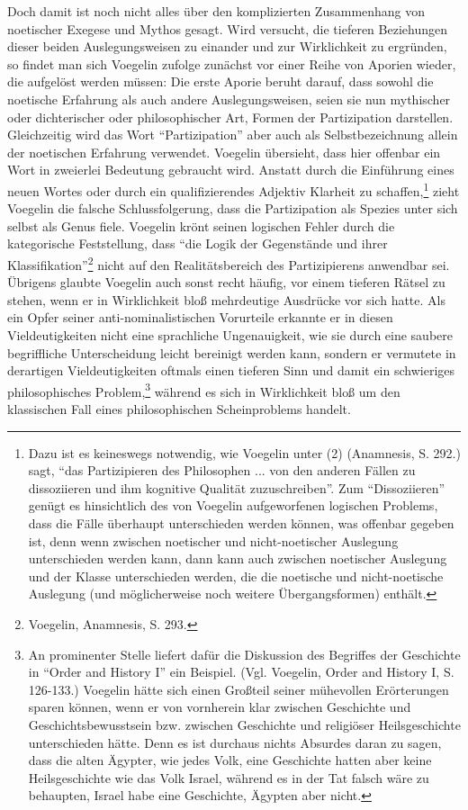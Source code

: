 Doch damit ist noch nicht alles über den komplizierten Zusammenhang von
noetischer Exegese und Mythos gesagt. Wird versucht, die tieferen Beziehungen
dieser beiden Auslegungsweisen zu einander und zur Wirklichkeit zu ergründen,
so findet man sich Voegelin zufolge zunächst vor einer Reihe von Aporien
wieder, die aufgelöst werden müssen: Die erste Aporie beruht darauf, dass
sowohl die noetische Erfahrung als auch andere Auslegungsweisen, seien sie nun
mythischer oder dichterischer oder philosophischer Art, Formen der
Partizipation darstellen.  Gleichzeitig wird das Wort "`Partizipation"' aber
auch als Selbstbezeichnung allein der noetischen Erfahrung verwendet.
Voegelin übersieht, dass hier offenbar ein Wort in zweierlei Bedeutung
gebraucht wird. Anstatt durch die Einführung eines neuen Wortes oder durch ein
qualifizierendes Adjektiv Klarheit zu schaffen,\footnote{Dazu ist es
  keineswegs notwendig, wie Voegelin unter (2) (Anamnesis, S. 292.) sagt,
  "`das Partizipieren des Philosophen ... von den anderen Fällen zu
  dissoziieren und ihm kognitive Qualität zuzuschreiben"'.  Zum
  "`Dissoziieren"' genügt es hinsichtlich des von Voegelin aufgeworfenen
  logischen Problems, dass die Fälle überhaupt unterschieden werden können,
  was offenbar gegeben ist, denn wenn zwischen noetischer und nicht-noetischer
  Auslegung unterschieden werden kann, dann kann auch zwischen noetischer
  Auslegung und der Klasse unterschieden werden, die die noetische und
  nicht-noetische Auslegung (und möglicherweise noch weitere Übergangsformen)
  enthält.} zieht Voegelin die falsche Schlussfolgerung, dass die
Partizipation als Spezies unter sich selbst als Genus fiele. Voegelin krönt
seinen logischen Fehler durch die kategorische Feststellung, dass "`die Logik
der Gegenstände und ihrer Klassifikation"'\footnote{Voegelin, Anamnesis, S.
  293.}  nicht auf den Realitätsbereich des Partizipierens anwendbar sei.
Übrigens glaubte Voegelin auch sonst recht häufig, vor einem tieferen Rätsel
zu stehen, wenn er in Wirklichkeit bloß mehrdeutige Ausdrücke vor sich hatte.
Als ein Opfer seiner anti-nominalistischen Vorurteile erkannte er in diesen
Vieldeutigkeiten nicht eine sprachliche Ungenauigkeit, wie sie durch eine
saubere begriffliche Unterscheidung leicht bereinigt werden kann, sondern er
vermutete in derartigen Vieldeutigkeiten oftmals einen tieferen Sinn und damit
ein schwieriges philosophisches Problem,\footnote{An prominenter Stelle
  liefert dafür die Diskussion des Begriffes der Geschichte in "`Order and
  History I"' ein Beispiel. (Vgl. Voegelin, Order and History I, S. 126-133.)
  Voegelin hätte sich einen Großteil seiner mühevollen Erörterungen sparen
  können, wenn er von vornherein klar zwischen Geschichte und
  Geschichtsbewusstsein bzw.  zwischen Geschichte und religiöser
  Heilsgeschichte unterschieden hätte. Denn es ist durchaus nichts Absurdes
  daran zu sagen, dass die alten Ägypter, wie jedes Volk, eine Geschichte
  hatten aber keine Heilsgeschichte wie das Volk Israel, während es in der Tat
  falsch wäre zu behaupten, Israel habe eine Geschichte, Ägypten aber nicht.}
während es sich in Wirklichkeit bloß um den klassischen Fall eines
philosophischen Scheinproblems handelt.

